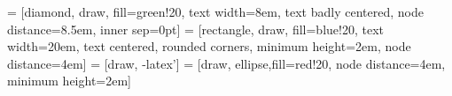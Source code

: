 \documentclass[en]{aghdpl}  %
\author{Krzysztof Szczęsny, Jan Twardowski}
\date{2017}
\begin{document}
\titlepages

{
	\fancyhf{}
	\renewcommand{\headrulewidth}{0pt}
	\renewcommand{\footrulewidth}{0pt}
}

\setcounter{tocdepth}{2}
\tableofcontents
\clearpage

 = [diamond, draw, fill=green!20, 
text width=8em, text badly centered, node distance=8.5em, inner sep=0pt]
 = [rectangle, draw, fill=blue!20, 
text width=20em, text centered, rounded corners, minimum height=2em, node distance=4em]
 = [draw, -latex']
 = [draw, ellipse,fill=red!20, node distance=4em,
minimum height=2em]








\renewcommand*{\bibfont}{\small}
	\printbibliography




% 
% 
\end{document}
